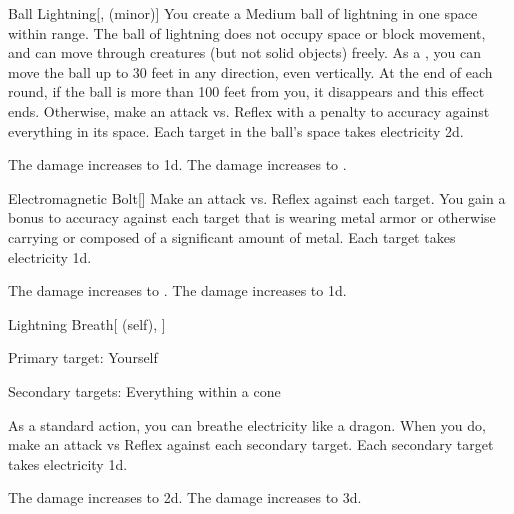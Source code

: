 \lowercase{\hypertarget{spell:Ball Lightning}{}}\label{spell:Ball Lightning}
\begin{freeability}[Rank 4]{\hypertarget{spell:Ball Lightning}{Ball Lightning}}[,  (minor)]
You create a Medium ball of lightning in one space within \rngmed range.
The ball of lightning does not occupy space or block movement, and can move through creatures (but not solid objects) freely.
As a , you can move the ball up to 30 feet in any direction, even vertically.
At the end of each round, if the ball is more than 100 feet from you, it disappears and this effect ends.
Otherwise, make an attack vs. Reflex with a  penalty to accuracy against everything in its space.
\hit Each target in the ball's space takes electricity  \minus2d.

\rankline
{} The damage increases to  \minus1d.
 The damage increases to .
\end{freeability}
\vspace{0.25em}



\lowercase{\hypertarget{spell:Electromagnetic Bolt}{}}\label{spell:Electromagnetic Bolt}
\begin{freeability}[Rank 4]{\hypertarget{spell:Electromagnetic Bolt}{Electromagnetic Bolt}}[]
Make an attack vs. Reflex against each target.
You gain a  bonus to accuracy against each target that is wearing metal armor or otherwise carrying or composed of a significant amount of metal.
\hit Each target takes electricity  \minus1d.

\rankline
{} The damage increases to .
 The damage increases to  \plus1d.
\end{freeability}
\vspace{0.25em}



\lowercase{\hypertarget{spell:Lightning Breath}{}}\label{spell:Lightning Breath}
\begin{attuneability}[Rank 4]{\hypertarget{spell:Lightning Breath}{Lightning Breath}}[ (self), ]

Primary target: Yourself
\par\noindent
Secondary targets: Everything within a \arealarge cone

As a standard action, you can breathe electricity like a dragon.
When you do, make an attack vs Reflex against each secondary target.
\hit Each secondary target takes electricity  \plus1d.

\rankline
{} The damage increases to  \plus2d.
 The damage increases to  \plus3d.
\end{attuneability}
\vspace{0.25em}



